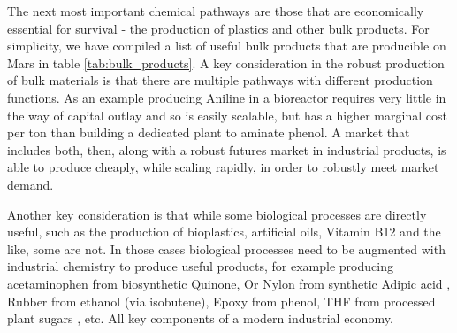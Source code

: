 \documentclass[fleqn,10pt]{Stylesheet} %
\begin{document}
The next most important chemical pathways are those that are economically essential for survival - the production of plastics and other bulk products. For simplicity, we have compiled a list of useful bulk products that are producible on Mars in table \ref{tab:bulk_products}. A key consideration in the robust production of bulk materials is that there are multiple pathways with different production functions. As an example producing Aniline in a bioreactor requires very little in the way of capital outlay and so is easily scalable, but has a higher marginal cost per ton than building a dedicated plant to aminate phenol. A market that includes both, then, along with a robust futures market in industrial products, is able to produce cheaply, while scaling rapidly, in order to robustly meet market demand.

Another key consideration is that while some biological processes are directly useful, such as the production of bioplastics, artificial oils, Vitamin B12 and the like, some are not. In those cases biological processes need to be augmented with industrial chemistry to produce useful products, for example producing acetaminophen from biosynthetic Quinone, Or Nylon from synthetic Adipic acid \cite{WeiNiu2002}, Rubber from ethanol \cite{JunmingSun2011} (via isobutene), Epoxy from phenol, THF from processed plant sugars \cite{ShuoChen2018}, etc. All key components of a modern industrial economy.
\end{document}
